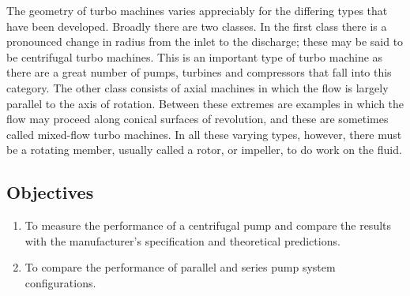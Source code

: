 The geometry of turbo machines varies appreciably for the differing types that have been developed. Broadly there are two classes. In the first class there is a pronounced change in radius from the inlet to the discharge; these may be said to be centrifugal turbo machines. This is an important type of turbo machine as there are a great number of pumps, turbines and compressors that fall into this category. The other class consists of axial machines in which the flow is largely parallel to the axis of rotation. Between these extremes are examples in which the flow may proceed along conical surfaces of revolution, and these are sometimes called mixed-flow turbo machines. In all these varying types, however, there must be a rotating member, usually called a rotor, or impeller, to do work on the fluid.

\subsection{Objectives}
\begin{enumerate}
    \item To measure the performance of a centrifugal pump and compare the results with the manufacturer’s specification and theoretical predictions.
    \item To compare the performance of parallel and series pump system configurations.
\end{enumerate}